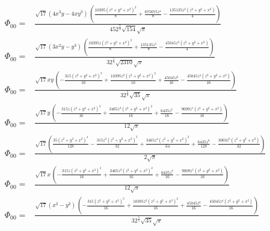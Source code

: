 \documentclass[10pt]{article}
\begin{document}
\begin{align*}
\Phi_{00} = &\frac{\sqrt{17} \left( 4 {{x}^{3}} y-4 x {{y}^{3}}\right) \, \left( \frac{10395 {{\left( {{z}^{2}}+{{y}^{2}}+{{x}^{2}}\right) }^{2}}}{8}+\frac{675675 {{z}^{4}}}{8}-\frac{135135 {{z}^{2}} \left( {{z}^{2}}+{{y}^{2}}+{{x}^{2}}\right) }{4}\right) }{45 {{2}^{\frac{7}{2}}} \sqrt{154} \sqrt{\ensuremath{\pi} }}\\
\Phi_{00} = &\frac{\sqrt{17} \left( 3 {{x}^{2}} y-{{y}^{3}}\right) \, \left( \frac{10395 z {{\left( {{z}^{2}}+{{y}^{2}}+{{x}^{2}}\right) }^{2}}}{8}+\frac{135135 {{z}^{5}}}{8}-\frac{45045 {{z}^{3}} \left( {{z}^{2}}+{{y}^{2}}+{{x}^{2}}\right) }{4}\right) }{3 {{2}^{\frac{5}{2}}} \sqrt{2310} \sqrt{\ensuremath{\pi} }}\\
\Phi_{00} = &\frac{\sqrt{17} x y\, \left( -\frac{315 {{\left( {{z}^{2}}+{{y}^{2}}+{{x}^{2}}\right) }^{3}}}{16}+\frac{10395 {{z}^{2}} {{\left( {{z}^{2}}+{{y}^{2}}+{{x}^{2}}\right) }^{2}}}{16}+\frac{45045 {{z}^{6}}}{16}-\frac{45045 {{z}^{4}} \left( {{z}^{2}}+{{y}^{2}}+{{x}^{2}}\right) }{16}\right) }{3 {{2}^{\frac{3}{2}}} \sqrt{35} \sqrt{\ensuremath{\pi} }}\\
\Phi_{00} = &\frac{\sqrt{17} y\, \left( -\frac{315 z {{\left( {{z}^{2}}+{{y}^{2}}+{{x}^{2}}\right) }^{3}}}{16}+\frac{3465 {{z}^{3}} {{\left( {{z}^{2}}+{{y}^{2}}+{{x}^{2}}\right) }^{2}}}{16}+\frac{6435 {{z}^{7}}}{16}-\frac{9009 {{z}^{5}} \left( {{z}^{2}}+{{y}^{2}}+{{x}^{2}}\right) }{16}\right) }{12 \sqrt{\ensuremath{\pi} }}\\
\Phi_{00} = &\frac{\sqrt{17} \left( \frac{35 {{\left( {{z}^{2}}+{{y}^{2}}+{{x}^{2}}\right) }^{4}}}{128}-\frac{315 {{z}^{2}} {{\left( {{z}^{2}}+{{y}^{2}}+{{x}^{2}}\right) }^{3}}}{32}+\frac{3465 {{z}^{4}} {{\left( {{z}^{2}}+{{y}^{2}}+{{x}^{2}}\right) }^{2}}}{64}+\frac{6435 {{z}^{8}}}{128}-\frac{3003 {{z}^{6}} \left( {{z}^{2}}+{{y}^{2}}+{{x}^{2}}\right) }{32}\right) }{2 \sqrt{\ensuremath{\pi} }}\\
\Phi_{00} = &\frac{\sqrt{17} x\, \left( -\frac{315 z {{\left( {{z}^{2}}+{{y}^{2}}+{{x}^{2}}\right) }^{3}}}{16}+\frac{3465 {{z}^{3}} {{\left( {{z}^{2}}+{{y}^{2}}+{{x}^{2}}\right) }^{2}}}{16}+\frac{6435 {{z}^{7}}}{16}-\frac{9009 {{z}^{5}} \left( {{z}^{2}}+{{y}^{2}}+{{x}^{2}}\right) }{16}\right) }{12 \sqrt{\ensuremath{\pi} }}\\
\Phi_{00} = &\frac{\sqrt{17} \left( {{x}^{2}}-{{y}^{2}}\right) \, \left( -\frac{315 {{\left( {{z}^{2}}+{{y}^{2}}+{{x}^{2}}\right) }^{3}}}{16}+\frac{10395 {{z}^{2}} {{\left( {{z}^{2}}+{{y}^{2}}+{{x}^{2}}\right) }^{2}}}{16}+\frac{45045 {{z}^{6}}}{16}-\frac{45045 {{z}^{4}} \left( {{z}^{2}}+{{y}^{2}}+{{x}^{2}}\right) }{16}\right) }{3 {{2}^{\frac{5}{2}}} \sqrt{35} \sqrt{\ensuremath{\pi} }}\\

\end{align*}
\end{document}
